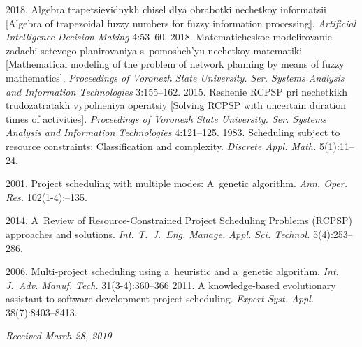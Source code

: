 \begin{multicols}{2}
{{\begin{thebibliography}{99}
 2018. Algebra trapetsievidnykh chisel 
dlya obrabotki nechetkoy informatsii [Algebra of
trapezoidal fuzzy numbers for fuzzy information processing]. 
\textit{Artificial 
Intelligence Decision Making} 4:53--60.
 2018. Ma\-te\-ma\-ti\-che\-skoe 
modelirovanie zadachi setevogo planirovaniya s~pomoshch'yu nechetkoy 
matematiki [Mathematical modeling of the problem of network planning by means of 
fuzzy mathematics]. \textit{Proceedings of Voronezh State University.
Ser. Systems Analysis 
and Information Technologies} 3:155--162.
 2015. Reshenie RCPSP pri 
nechetkikh trudozatratakh vypolneniya ope\-ra\-tsiy [Solving RCPSP with 
 uncertain duration times of
activities]. \textit{Proceedings of Voronezh State University.
Ser. Systems Analysis 
and Information Technologies} 4:121--125.
 1983. Scheduling 
subject to resource constraints: Classification and complexity. \textit{Discrete 
Appl. Math.} 5(1):11--24.

 2001. Project scheduling with multiple modes: A~genetic 
algorithm. \textit{Ann. Oper. Res.} 102(1-4):--135.

 2014. A~Review of Resource-Constrained Project Scheduling 
Problems (RCPSP) approaches and solutions. \textit{Int. T.~J.~Eng. Manage. Appl. 
Sci.  Technol.}  5(4):253--286.

 2006. Multi-project scheduling using 
a~heuristic and a~genetic algorithm. \textit{Int. J.~Adv. 
Manuf. Tech.} 31(3-4):360--366
 2011. A knowledge-based evolutionary 
assistant to software development project scheduling. \textit{Expert Syst. 
Appl.} 38(7):8403--8413.
\end{thebibliography}

 }
 }

\end{multicols}

\vspace*{-6pt}

\hfill{\small\textit{Received March 28, 2019}}


